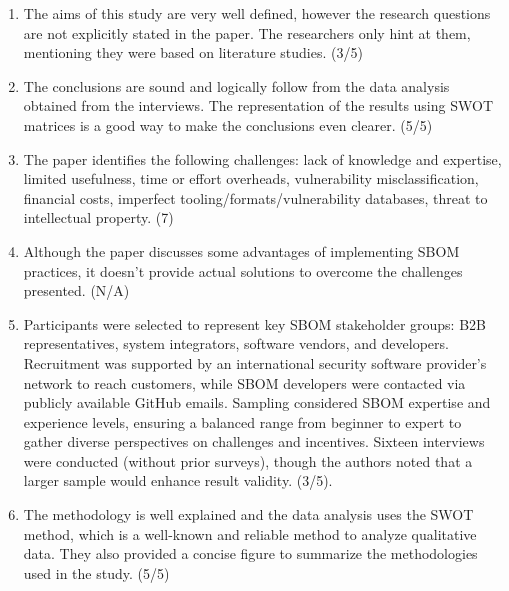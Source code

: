 \begin{enumerate}
    \item The aims of this study are very well defined, however the research questions are not explicitly stated in the paper. The researchers only hint at them, mentioning they were based on literature studies. (3/5)
    \item The conclusions are sound and logically follow from the data analysis obtained from the interviews. The representation of the results using SWOT matrices is a good way to make the conclusions even clearer. (5/5)
    \item The paper identifies the following challenges: lack of knowledge and expertise, limited usefulness, time or effort overheads, vulnerability misclassification, financial costs, imperfect tooling/formats/vulnerability databases, threat to intellectual property. (7)
    \item Although the paper discusses some advantages of implementing SBOM practices, it doesn't provide actual solutions to overcome the challenges presented. (N/A)
    \item Participants were selected to represent key SBOM stakeholder groups: B2B representatives, system integrators, software vendors, and developers. Recruitment was supported by an international security software provider's network to reach customers, while SBOM developers were contacted via publicly available GitHub emails. Sampling considered SBOM expertise and experience levels, ensuring a balanced range from beginner to expert to gather diverse perspectives on challenges and incentives. Sixteen interviews were conducted (without prior surveys), though the authors noted that a larger sample would enhance result validity. (3/5).
    \item The methodology is well explained and the data analysis uses the SWOT method, which is a well-known and reliable method to analyze qualitative data. They also provided a concise figure to summarize the methodologies used in the study. (5/5)
\end{enumerate}

